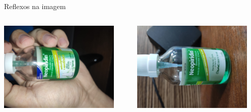 \begin{frame}{Reflexos na imagem}
	\centering
	\begin{columns}
		\begin{column}{0.5\textwidth}
			\centering
			\includegraphics[keepaspectratio, width=0.9\textwidth, angle=-90]{../pictures/IMG_20220908_191849.jpg}
		\end{column}
		\begin{column}{0.5\textwidth}
			\centering
			\includegraphics[keepaspectratio, width=0.9\textwidth, angle=90]{../pictures/IMG_20240301_105852.jpg}
		\end{column}
	\end{columns}
\end{frame}

